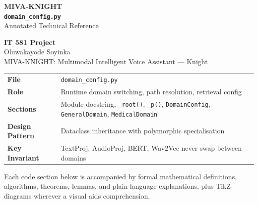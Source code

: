 \documentclass[12pt,a4paper]{article}
\theoremstyle{definition}
\theoremstyle{remark}
\begin{document}
\begin{titlepage}
\centering\vspace*{1.5cm}
{\Huge\bfseries\color{cDark} MIVA-KNIGHT}\\[0.4cm]
{\Large\bfseries \texttt{domain\_config.py}}\\[0.3cm]
{\large Annotated Technical Reference}\\[1.0cm]


\vspace{1cm}
{\large\bfseries IT 581 Project}\\[0.3cm]
{\large Oluwakayode Soyinka}\\[0.3cm]
{\normalsize MIVA-KNIGHT: Multimodal Intelligent Voice Assistant — Knight}\\[0.8cm]

\begin{tabular}{ll}
\toprule
\textbf{File}            & \texttt{domain\_config.py} \\
\textbf{Role}            & Runtime domain switching, path resolution, retrieval config \\
\textbf{Sections}        & Module docstring, \texttt{\_root()}, \texttt{\_p()},
                           \texttt{DomainConfig}, \texttt{GeneralDomain},
                           \texttt{MedicalDomain} \\
\textbf{Design Pattern}  & Dataclass inheritance with polymorphic specialisation \\
\textbf{Key Invariant}   & TextProj, AudioProj, BERT, Wav2Vec never swap between domains \\
\bottomrule
\end{tabular}

\vfill
{\small\color{gray}Each code section below is accompanied by formal mathematical
definitions, algorithms, theorems, lemmas, and plain-language explanations,
plus TikZ diagrams wherever a visual aids comprehension.}
\end{titlepage}
\end{document}
